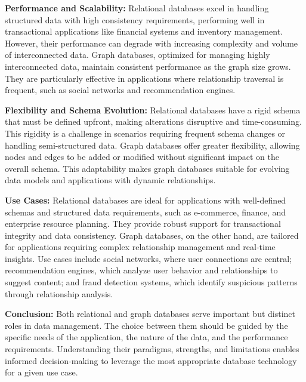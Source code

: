 \textbf{Performance and Scalability:} Relational databases excel in handling structured data with high consistency requirements, performing well in transactional applications like financial systems and inventory management. However, their performance can degrade with increasing complexity and volume of interconnected data. Graph databases, optimized for managing highly interconnected data, maintain consistent performance as the graph size grows. They are particularly effective in applications where relationship traversal is frequent, such as social networks and recommendation engines.

\textbf{Flexibility and Schema Evolution:} Relational databases have a rigid schema that must be defined upfront, making alterations disruptive and time-consuming. This rigidity is a challenge in scenarios requiring frequent schema changes or handling semi-structured data. Graph databases offer greater flexibility, allowing nodes and edges to be added or modified without significant impact on the overall schema. This adaptability makes graph databases suitable for evolving data models and applications with dynamic relationships.

\textbf{Use Cases:} Relational databases are ideal for applications with well-defined schemas and structured data requirements, such as e-commerce, finance, and enterprise resource planning. They provide robust support for transactional integrity and data consistency. Graph databases, on the other hand, are tailored for applications requiring complex relationship management and real-time insights. Use cases include social networks, where user connections are central; recommendation engines, which analyze user behavior and relationships to suggest content; and fraud detection systems, which identify suspicious patterns through relationship analysis.

\textbf{Conclusion:} Both relational and graph databases serve important but distinct roles in data management. The choice between them should be guided by the specific needs of the application, the nature of the data, and the performance requirements. Understanding their paradigms, strengths, and limitations enables informed decision-making to leverage the most appropriate database technology for a given use case.
